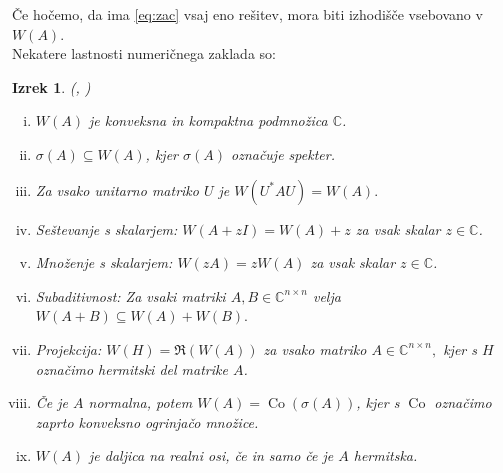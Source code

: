 \documentclass[12pt,a4paper]{amsart}
\theoremstyle{definition}
\theoremstyle{plain}
\newtheorem{izrek}[definicija]{Izrek}
\newcommand{\Co}{\operatorname{Co}} %
\newcommand{\C}{\mathbb C}
\begin{document}
Če hočemo, da ima \eqref{eq:zac} vsaj eno rešitev, mora biti izhodišče vsebovano v $W(A)$. \\

Nekatere lastnosti numeričnega zaklada so:

\begin{izrek} (\cite{num}, \cite{zaloga})
\begin{enumerate}[(i)]
\item \label{l1} $W(A)$ je konveksna in kompaktna podmnožica $\C$.
\item \label{l2} $\sigma(A)\subseteq W(A)$, kjer $\sigma(A)$ označuje spekter.
\item \label{l3} Za vsako unitarno matriko $U$ je $W(U^\ast AU)=W(A).$
\item \label{l4} Seštevanje s skalarjem: $W(A+zI)=W(A)+z$ za vsak skalar $z \in \C$.
\item \label{l5} Množenje s skalarjem: $W(zA)=zW(A)$ za vsak skalar $z \in \C$.
\item \label{l6} Subaditivnost: Za vsaki matriki $A, B \in \C^{n\times n}$ velja $W(A+B) \subseteq W(A) +W(B).$
\item \label{l7} Projekcija: $W(H)= \Re( W(A))$ za vsako matriko $A\in \C^{n\times n},$ kjer s $H$ označimo hermitski del matrike $A$.
\item \label{l8} Če je $A$ normalna, potem $W(A)=\Co(\sigma(A))$, kjer s $\Co$ označimo zaprto konveksno ogrinjačo množice.
\item \label{l9} $W(A)$ je daljica na realni osi, če in samo če je $A$ hermitska.
\end{enumerate}
\end{izrek}
\end{document}
